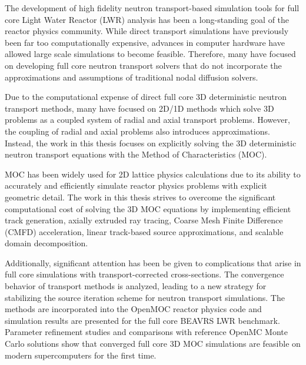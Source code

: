 \begin{abstractpage}

The development of high fidelity neutron transport-based simulation tools for full core Light Water Reactor (LWR) analysis has been a long-standing goal of the reactor physics community. While direct transport simulations have previously been far too computationally expensive, advances in computer hardware have allowed large scale simulations to become feasible. Therefore, many have focused on developing full core neutron transport solvers that do not incorporate the approximations and assumptions of traditional nodal diffusion solvers. 

Due to the computational expense of direct full core 3D deterministic neutron transport methods, many have focused on 2D/1D methods which solve 3D problems as a coupled system of radial and axial transport problems. However, the coupling of radial and axial problems also introduces approximations. Instead, the work in this thesis focuses on explicitly solving the 3D deterministic neutron transport equations with the Method of Characteristics (MOC).

MOC has been widely used for 2D lattice physics calculations due to its ability to accurately and efficiently simulate reactor physics problems with explicit geometric detail. The work in this thesis strives to overcome the significant computational cost of solving the 3D MOC equations by implementing efficient track generation, axially extruded ray tracing, Coarse Mesh Finite Difference (CMFD) acceleration, linear track-based source approximations, and scalable domain decomposition. 

Additionally, significant attention has been be given to complications that arise in full core simulations with transport-corrected cross-sections. The convergence behavior of transport methods is analyzed, leading to a new strategy for stabilizing the source iteration scheme for neutron transport simulations. The methods are incorporated into the OpenMOC reactor physics code and simulation results are presented for the full core BEAVRS LWR benchmark. Parameter refinement studies and comparisons with reference OpenMC Monte Carlo solutions show that converged full core 3D MOC simulations are feasible on modern supercomputers for the first time.




\end{abstractpage}
